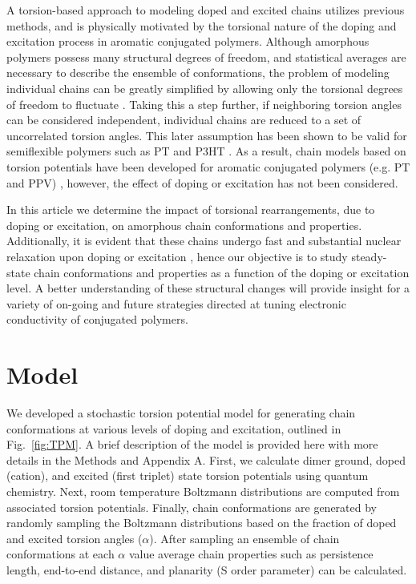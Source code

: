 A torsion-based approach to modeling doped and excited chains utilizes previous methods, and is physically motivated by the torsional nature of the doping and excitation process in aromatic conjugated polymers. Although amorphous polymers possess many structural degrees of freedom, and statistical averages are necessary to describe the ensemble of conformations, the problem of modeling individual chains can be greatly simplified by allowing only the torsional degrees of freedom to fluctuate \cite{Flory1989}. Taking this a step further, if neighboring torsion angles can be considered independent, individual chains are reduced to a set of uncorrelated torsion angles. This later assumption has been shown to be valid for semiflexible polymers such as PT and P3HT \cite{Westenhoff2006, Zhang2014}. As a result, chain models based on torsion potentials have been developed for aromatic conjugated polymers (e.g. PT and PPV) \cite{Zhang2014, Claudio2001}, however, the effect of doping or excitation has not been considered.

In this article we determine the impact of torsional rearrangements, due to doping or excitation, on amorphous chain conformations and properties. Additionally, it is evident that these chains undergo fast and substantial nuclear relaxation upon doping or excitation \cite{Zhou2015, Busby2011}, hence our objective is to study steady-state chain conformations and properties as a function of the doping or excitation level. A better understanding of these structural changes will provide insight for a variety of on-going and future strategies directed at tuning electronic conductivity of conjugated polymers.

\section{Model}

We developed a stochastic torsion potential model for generating chain conformations at various levels of doping and excitation, outlined in Fig.~\ref{fig:TPM}. A brief description of the model is provided here with more details in the Methods and Appendix A. First, we calculate dimer ground, doped (cation), and excited (first triplet) state torsion potentials using quantum chemistry. Next, room temperature Boltzmann distributions are computed from associated torsion potentials. Finally, chain conformations are generated by randomly sampling the Boltzmann distributions based on the fraction of doped and excited torsion angles ($\alpha$). After sampling an ensemble of chain conformations at each $\alpha$ value average chain properties such as persistence length, end-to-end distance, and planarity (S order parameter) can be calculated.

